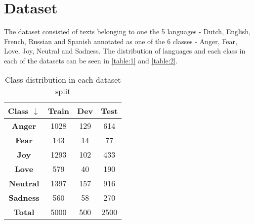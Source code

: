 \documentclass[11pt]{article}
\begin{document}

\section{Dataset}
The dataset consisted of texts belonging to one the 5 languages - Dutch, English, French, Russian and Spanish annotated as one of the 6 classes - Anger, Fear, Love, Joy, Neutral and Sadness. The distribution of languages and each class in each of the datasets can be seen in \autoref{table:1} and \autoref{table:2}.

\begin{table}[!ht]
    \centering
    \begin{tabular}{|c|c|c|c|}
    \hline
    \textbf{Class $\downarrow$}  & \textbf{Train}       & \textbf{Dev}         & \textbf{Test}    \\
    \hline     
    \textbf{Anger}               & 1028                 & 129                  & 614              \\
    \textbf{Fear}                & 143                  & 14                   & 77               \\
    \textbf{Joy}                 & 1293                 & 102                  & 433              \\
    \textbf{Love}                & 579                  & 40                   & 190              \\
    \textbf{Neutral}             & 1397                 & 157                  & 916              \\
    \textbf{Sadness}             & 560                  & 58                   & 270              \\
    \hline
    \textbf{Total}               & 5000                 & 500                  & 2500             \\
    \hline
    \end{tabular}
    \caption{Class distribution in each dataset split}
    \label{table:1}
\end{table}
\end{document}
